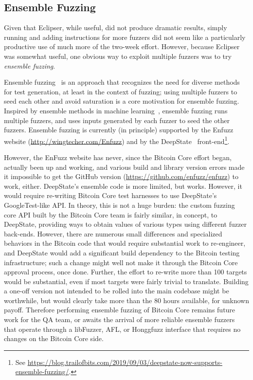 \subsection{Ensemble Fuzzing}

Given that Eclipser, while useful, did not produce dramatic results, simply running and adding instructions for more fuzzers did not seem like a particularly productive use of much more of the two-week effort.  However, because Eclipser was somewhat useful, one obvious way to exploit multiple fuzzers was to try \emph{ensemble fuzzing}.

Ensemble fuzzing~\cite{chen2019enfuzz} is an approach that recognizes the need for
diverse methods for test generation, at least in the context of
fuzzing; using multiple fuzzers to seed each other and avoid saturation is a core motivation for ensemble fuzzing.   Inspired by ensemble methods in machine learning~\cite{dietterich2002ensemble},
ensemble fuzzing runs multiple fuzzers, and uses inputs generated by
each fuzzer to seed the other fuzzers.  Ensemble fuzzing is currently (in principle)
supported by the Enfuzz website  (\url{http://wingtecher.com/Enfuzz})
and by the DeepState~\cite{goodman2018deepstate} front-end\footnote{See
  \url{https://blog.trailofbits.com/2019/09/03/deepstate-now-supports-ensemble-fuzzing/}.}.

However, the EnFuzz website has never, since the Bitcoin Core effort began, actually been up and working, and various build and library version errors made it impossible to get the GitHub version (\url{https://github.com/enfuzz/enfuzz}) to work, either.  DeepState's ensemble code is more limited, but works.  However, it would require re-writing Bitcoin Core test harnesses to use DeepState's GoogleTest-like API.  In theory, this is not a huge burden: the custom fuzzing core API built by the Bitcoin Core team is fairly similar, in concept, to DeepState, providing ways to obtain values of various types using different fuzzer back-ends.  However, there are numerous small differences and specialized behaviors in the Bitcoin code that would require substantial work to re-engineer, and DeepState would add a significant build dependency to the Bitcoin testing infrastructure; such a change might well not make it through the Bitcoin Core approval process, once done.   Further, the effort to re-write more than 100 targets would be substantial, even if most targets were fairly trivial to translate. Building a one-off version not intended to be rolled into the main codebase might be worthwhile, but would clearly take more than the 80 hours available, for unknown payoff.   Therefore performing ensemble fuzzing of Bitcoin Core remains future work for the QA team, or awaits the arrival of more reliable ensemble fuzzers that operate through a libFuzzer, AFL, or Honggfuzz interface that requires no changes on the Bitcoin Core side.
